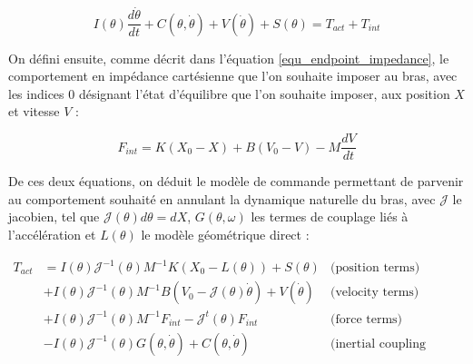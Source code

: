 \documentclass[12pt, a4paper]{article} %
\begin{document}
\begin{equation}
	I(\theta)\frac{d\dot{\theta}}{dt} + C(\theta, \dot{\theta}) + V(\dot{\theta}) + S(\theta) = T_{act} + T_{int} 
\label{eq_modele_bras_hogan_1985}
\end{equation}

On défini ensuite, comme décrit dans l'équation \eqref{equ_endpoint_impedance}, le comportement en impédance cartésienne que l'on souhaite imposer au bras, avec les indices $0$ désignant l'état d'équilibre que l'on souhaite imposer, aux position $X$ et vitesse $V$ :

\begin{equation}
	F_{int} = K(X_0 - X) + B(V_0 - V) - M\frac{dV}{dt}	
\label{eq_impedance_hogan_1985}
\end{equation}

De ces deux équations, on déduit le modèle de commande permettant de parvenir au comportement souhaité en annulant la dynamique naturelle du bras, avec $\mathcal{J}$ le jacobien, tel que $\mathcal{J}(\theta)d\theta = dX$, $G(\theta,\omega)$ les termes de couplage liés à l'accélération et $L(\theta)$ le modèle géométrique direct :

\begin{equation}
		\begin{aligned}
			T_{act}  &	=    I(\theta)\mathcal{J}^{-1}(\theta)M^{-1}K(X_0-L(\theta))+S(\theta) & \text{(position terms)} \\
			             & +   I(\theta)\mathcal{J}^{-1}(\theta)M^{-1}B(V_0-\mathcal{J}(\theta)\dot{\theta})+V(\dot{\theta}) & \text{(velocity terms)} \\
			             & +   I(\theta)\mathcal{J}^{-1}(\theta)M^{-1}F_{int}-\mathcal{J}^t(\theta)F_{int} & \text{(force terms)} \\
			             & -    I(\theta)\mathcal{J}^{-1}(\theta)G(\theta, \dot{\theta})+C(\theta,\dot{\theta}) & \text{(inertial coupling terms)}
		\end{aligned}
\label{equ_impedance_control} %
\end{equation}
\end{document}
